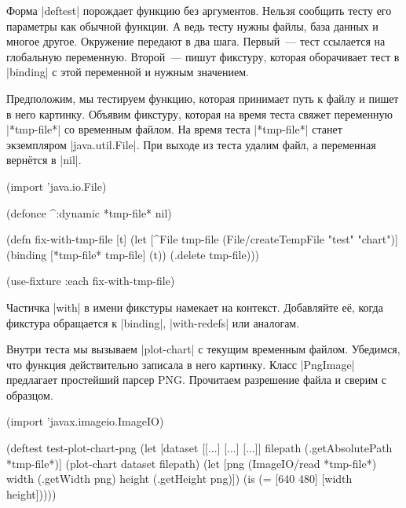 Форма \spverb|deftest| порождает функцию без аргументов. Нельзя сообщить тесту
его параметры как обычной функции. А ведь тесту нужны файлы, база данных и
многое другое. Окружение передают в два шага. Первый~--- тест ссылается на
глобальную переменную. Второй~--- пишут фикстуру, которая оборачивает тест в
\spverb|binding| с этой переменной и нужным значением.

Предположим, мы тестируем функцию, которая принимает путь к файлу и пишет в него
картинку. Объявим фикстуру, которая на время теста свяжет переменную
\spverb|*tmp-file*| со временным файлом. На время теста \spverb|*tmp-file*|
станет экземпляром \spverb|java.util.File|. При выходе из теста удалим файл, а
переменная вернётся в \spverb|nil|.


\begin{english}
  \begin{clojure}
(import 'java.io.File)

(defonce ^:dynamic *tmp-file* nil)

(defn fix-with-tmp-file [t]
  (let [^File tmp-file (File/createTempFile "test" "chart")]
    (binding [*tmp-file* tmp-file]
      (t))
    (.delete tmp-file)))

(use-fixture :each fix-with-tmp-file)
  \end{clojure}
\end{english}

Частичка \spverb|with| в имени фикстуры намекает на контекст. Добавляйте её,
когда фикстура обращается к \spverb|binding|, \spverb|with-redefs| или аналогам.


Внутри теста мы вызываем \spverb|plot-chart| с текущим временным
файлом. Убедимся, что функция действительно записала в него картинку. Класс
\spverb|PngImage| предлагает простейший парсер PNG. Прочитаем разрешение файла и
сверим с образцом.

\begin{english}
  \begin{clojure}
(import 'javax.imageio.ImageIO)

(deftest test-plot-chart-png
  (let [dataset [[...] [...] [...]]
        filepath (.getAbsolutePath *tmp-file*)]
    (plot-chart dataset filepath)
    (let [png (ImageIO/read *tmp-file*)
          width (.getWidth png)
          height (.getHeight png)])
    (is (= [640 480] [width height]))))
  \end{clojure}
\end{english}


